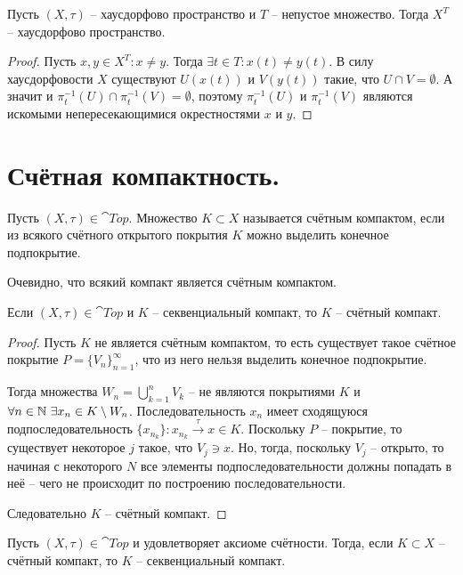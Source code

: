 \begin{proposition}
    Пусть $(X, \tau)$ -- хаусдорфово пространство и $T$ -- непустое множество.
    Тогда $X^T$ -- хаусдорфово пространство.
\end{proposition}
\begin{proof}
    Пусть $x, y \in X^T\colon x \neq y$.
    Тогда $\exists t \in T\colon x(t) \neq y(t)$.
    В силу хаусдорфовости $X$ существуют $U(x(t))$ и $V(y(t))$ такие, что $U \cap V = \emptyset$.
    А значит и $\pi^{-1}_t(U) \cap \pi^{-1}_t(V) = \emptyset$, поэтому $\pi^{-1}_t(U)$ и $\pi^{-1}_t(V)$ являются искомыми непересекающимися окрестностями $x$ и $y$.
\end{proof}
\section{Счётная компактность.}
\begin{definition}
    Пусть $(X, \tau) \in \cat{Top}$.
    Множество $K \subset X$ называется счётным компактом, если из всякого счётного открытого покрытия $K$ можно выделить конечное подпокрытие.
\end{definition}
\begin{note}
    Очевидно, что всякий компакт является счётным компактом.
\end{note}
\begin{proposition}
    Если $(X, \tau) \in \cat{Top}$ и $K$ -- секвенциальный компакт, то $K$ -- счётный компакт.
\end{proposition}
\begin{proof}
    Пусть $K$ не является счётным компактом, то есть существует такое счётное покрытие $P = \{V_n\}_{n = 1}^{\infty}$, что из него нельзя выделить конечное подпокрытие.

    Тогда множества $W_n = \bigcup_{k = 1}^{n} V_k$ -- не являются покрытиями $K$ и $\forall n \in \mathbb{N} \  \exists x_n \in K \setminus W_n$.
    Последовательность $x_n$ имеет сходящуюся подпоследовательность $\{x_{n_k}\}\colon x_{n_k} \xrightarrow{\tau} x \in K$.
    Поскольку $P$ -- покрытие, то существует некоторое $j$ такое, что $V_j \ni x$.
    Но, тогда, поскольку $V_j$ -- открыто, то начиная с некоторого $N$ все элементы подпоследовательности должны попадать в неё -- чего не происходит по построению последовательности.

    Следовательно $K$ -- счётный компакт.
\end{proof}
\begin{proposition}
    Пусть $(X, \tau) \in \cat{Top}$ и удовлетворяет аксиоме счётности.
    Тогда, если $K \subset X$ -- счётный компакт, то $K$ -- секвенциальный компакт.
\end{proposition}
